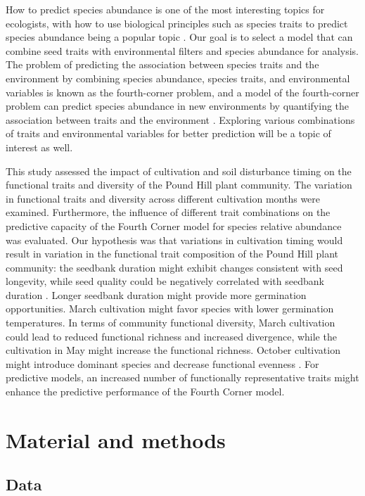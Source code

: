 \documentclass[a4paper, 11, margin=2cm]{article}
\begin{document}
    How to predict species abundance is one of the most interesting topics for ecologists, with how to use biological principles such as species traits to predict species abundance being a popular topic \citep{laughlin2012predictive}. Our goal is to select a model that can combine seed traits with environmental filters and species abundance for analysis. The problem of predicting the association between species traits and the environment by combining species abundance, species traits, and environmental variables is known as the fourth-corner problem, and a model of the fourth-corner problem can predict species abundance in new environments by quantifying the association between traits and the environment \citep{brown2014fourth}. Exploring various combinations of traits and environmental variables for better prediction will be a topic of interest as well.

    This study assessed the impact of cultivation and soil disturbance timing on the functional traits and diversity of the Pound Hill plant community. The variation in functional traits and diversity across different cultivation months were examined. Furthermore, the influence of different trait combinations on the predictive capacity of the Fourth Corner model for species relative abundance was evaluated. Our hypothesis was that variations in cultivation timing would result in variation in the functional trait composition of the Pound Hill plant community: the seedbank duration might exhibit changes consistent with seed longevity, while seed quality could be negatively correlated with seedbank duration \citep{crawley2004timing}. Longer seedbank duration might provide more germination opportunities. March cultivation might favor species with lower germination temperatures. In terms of community functional diversity, March cultivation could lead to reduced functional richness and increased divergence, while the cultivation in May might increase the functional richness. October cultivation might introduce dominant species and decrease functional evenness \citep{crawley2004timing}. For predictive models, an increased number of functionally representative traits might enhance the predictive performance of the Fourth Corner model.

    \section{Material and methods}
     
    \subsection{Data}
    
\end{document}
